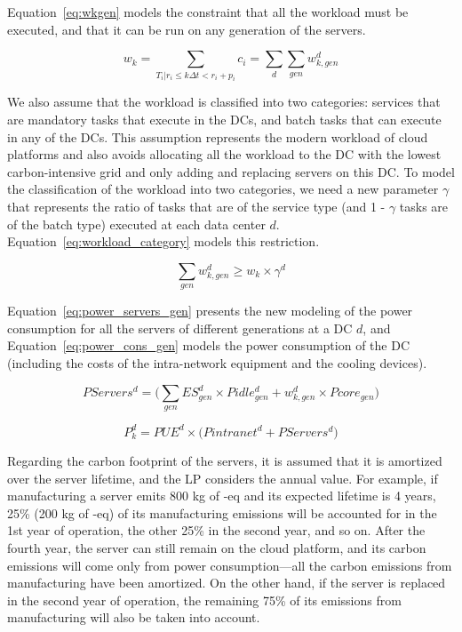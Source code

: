 Equation~\eqref{eq:wkgen} models the constraint that all the workload must be executed, and that it can be run on any generation of the servers.

\begin{equation} \label{eq:wkgen}
    w_k = \sum_{T_i|r_i\leq k\Delta t<r_i+p_i} c_i = \sum_d \sum_{gen} w_{k,gen}^d
\end{equation}

We also assume that the workload is classified into two categories: services that are mandatory tasks that execute in the DCs, and batch tasks that can execute in any of the DCs. This assumption represents the modern workload of cloud platforms and also avoids allocating all the workload to the DC with the lowest carbon-intensive grid and only adding and replacing servers on this DC. To model the classification of the workload into two categories, we need a new parameter $\gamma$ that represents the ratio of tasks that are of the service type (and 1 - $\gamma$ tasks are of the batch type) executed at each data center $d$. Equation~\eqref{eq:workload_category} models this restriction.

\begin{equation} \label{eq:workload_category}
 \sum_{gen}  w_{k,gen}^d \geq  w_k \times \gamma^d
\end{equation}


Equation~\eqref{eq:power_servers_gen} presents the new modeling of the power consumption for all the servers of different generations at a DC $d$, and Equation~\eqref{eq:power_cons_gen} models the power consumption of the DC (including the costs of the intra-network equipment and the cooling devices).


\begin{equation} \label{eq:power_servers_gen}
   PServers^d  =  \big(\sum_{gen} ES_{gen}^d \times  Pidle_{gen}^d + w^d_{k,gen}  \times  Pcore_{gen} \big)
\end{equation}


\begin{equation} \label{eq:power_cons_gen}
   P^d_k  = PUE^d \times \big(Pintranet^d + PServers^d\big)
\end{equation}

Regarding the carbon footprint of the servers, it is assumed that it is amortized over the server lifetime, and the LP considers the annual value. For example, if manufacturing a server emits 800 kg of -eq and its expected lifetime is 4 years, 25\% (200 kg of -eq) of its manufacturing emissions will be accounted for in the 1st year of operation, the other 25\% in the second year, and so on. After the fourth year, the server can still remain on the cloud platform, and its carbon emissions will come only from power consumption---all the carbon emissions from manufacturing have been amortized. On the other hand, if the server is replaced in the second year of operation, the remaining 75\%  of its emissions from manufacturing will also be taken into account. 

